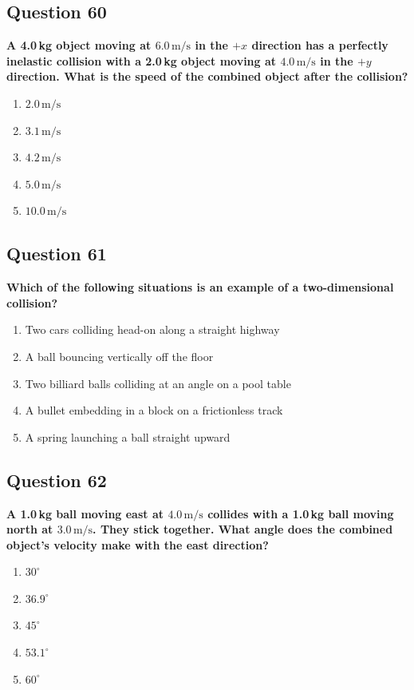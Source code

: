 \documentclass[12pt,letterpaper]{article}
\begin{document}
\subsection{Question 60}

\begin{questionbox}
\textbf{A 4.0\,kg object moving at $6.0\,\text{m/s}$ in the $+x$ direction has a perfectly inelastic collision with a 2.0\,kg object moving at $4.0\,\text{m/s}$ in the $+y$ direction. What is the speed of the combined object after the collision?}

\begin{enumerate}[label=\alph*)]
    \item $2.0\,\text{m/s}$
    \item $3.1\,\text{m/s}$
    \item $4.2\,\text{m/s}$
    \item $5.0\,\text{m/s}$
    \item $10.0\,\text{m/s}$
\end{enumerate}
\end{questionbox}

\subsection{Question 61}

\begin{questionbox}
\textbf{Which of the following situations is an example of a two-dimensional collision?}

\begin{enumerate}[label=\alph*)]
    \item Two cars colliding head-on along a straight highway
    \item A ball bouncing vertically off the floor
    \item Two billiard balls colliding at an angle on a pool table
    \item A bullet embedding in a block on a frictionless track
    \item A spring launching a ball straight upward
\end{enumerate}
\end{questionbox}

\subsection{Question 62}

\begin{questionbox}
\textbf{A 1.0\,kg ball moving east at $4.0\,\text{m/s}$ collides with a 1.0\,kg ball moving north at $3.0\,\text{m/s}$. They stick together. What angle does the combined object's velocity make with the east direction?}

\begin{enumerate}[label=\alph*)]
    \item $30^\circ$
    \item $36.9^\circ$
    \item $45^\circ$
    \item $53.1^\circ$
    \item $60^\circ$
\end{enumerate}
\end{questionbox}
\end{document}
